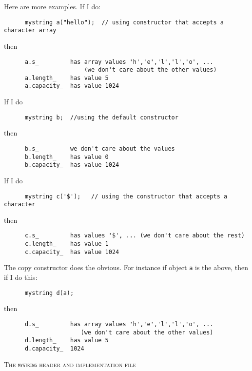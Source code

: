 Here are more examples. If I do:
{\small
\begin{Verbatim}
      mystring a("hello");  // using constructor that accepts a character array
\end{Verbatim}
}
then
{\small
\begin{Verbatim}
      a.s_         has array values 'h','e','l','l','o', ...
                       (we don't care about the other values)
      a.length_    has value 5
      a.capacity_  has value 1024
\end{Verbatim}
}
If I do
{\small
\begin{Verbatim}
      mystring b;  //using the default constructor
\end{Verbatim}
}
then
{\small
\begin{Verbatim}
      b.s_         we don't care about the values
      b.length_    has value 0
      b.capacity_  has value 1024
\end{Verbatim}
}
If I do
{\small
\begin{Verbatim}
      mystring c('$');   // using the constructor that accepts a character
\end{Verbatim}
}
then
{\small
\begin{Verbatim}
      c.s_         has values '$', ... (we don't care about the rest)
      c.length_    has value 1
      c.capacity_  has value 1024
\end{Verbatim}
}

The copy constructor does the obvious. For instance if object \verb!a!
is the above, then if I do this:
{\small
\begin{Verbatim}
      mystring d(a);
\end{Verbatim}
}
then
{\small
\begin{Verbatim}
      d.s_         has array values 'h','e','l','l','o', ... 
                      (we don't care about the other values)
      d.length_    has value 5
      d.capacity_  1024
\end{Verbatim}
}




\newpage
\textsc{The \textnormal{\texttt{mystring}} header and implementation file}

